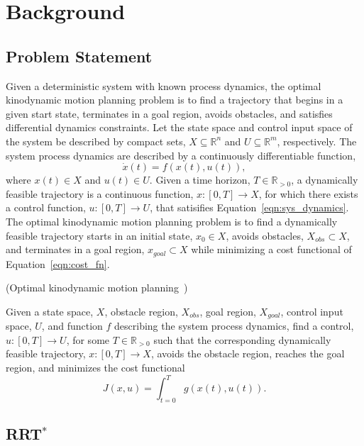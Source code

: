 \section{Background}
\subsection{Problem Statement}

Given a deterministic system with known process dynamics, the optimal
kinodynamic motion planning problem is to find a trajectory that
begins in a given start state, terminates in a goal region, avoids
obstacles, and satisfies differential dynamics constraints. Let the
state space and control input space of the system be described by
compact sets, $X \subseteq \mathbb{R}^n$ and $U \subseteq
\mathbb{R}^m$, respectively. The system process dynamics are described
by a continuously differentiable function,
\begin{equation}
\dot{x}(t) = f(x(t),u(t)),
\label{eqn:sys_dynamics}
\end{equation}
where $x(t) \in X$ and $u(t) \in U$. Given a time horizon, $T \in
\mathbb{R}_{>0}$, a dynamically feasible trajectory is a continuous
function, $x: [0,T] \to X$, for which there exists a control function,
$u:[0,T] \to U$, that satisifies Equation~\ref{eqn:sys_dynamics}. The
optimal kinodynamic motion planning problem is to find a dynamically
feasible trajectory starts in an initial state, $x_0 \in X$, avoids
obstacles, $X_{obs} \subset X$, and terminates in a goal region,
$x_{goal} \subset X$ while minimizing a cost functional of
Equation~\ref{eqn:cost_fn}.

\begin{problem}
\label{prob:1}
(Optimal kinodynamic motion planning~\cite{Karaman.Frazzoli:CDC10})

Given a state space, $X$, obstacle region, $X_{obs}$, goal region,
$X_{goal}$, control input space, $U$, and function $f$ describing the
system process dynamics, find a control, $u : [0,T] \to U$, for some $T
\in \mathbb{R}_{>0}$ such that the corresponding dynamically feasible
trajectory, $x : [0,T] \to X$, avoids the obstacle region, reaches the
goal region, and minimizes the cost functional
\begin{equation}
J(x,u) = \int_{t=0}^T g(x(t),u(t)).
\label{eqn:cost_fn}
\end{equation}

\end{problem}


\subsection{RRT$^*$}

